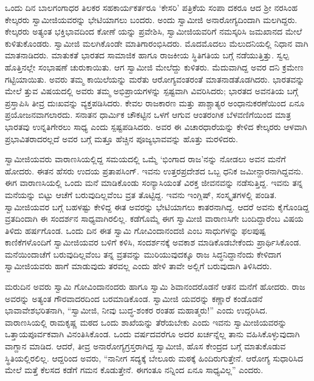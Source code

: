 ಒಂದು ದಿನ ಬಾಲಗಂಗಾಧರ ತಿಲಕರ ಸಹಕಾರ್ಯಕರ್ತರೂ ‘ಕೇಸರಿ’ ಪತ್ರಿಕೆಯ ಸಂಪಾ ದಕರೂ ಆದ ಶ್ರೀ ನರಸಿಂಹ ಕೇಲ್ಕರರು ಸ್ವಾಮೀಜಿಯವರನ್ನು ಭೇಟಿಯಾಗಲು ಬಂದರು. ಅಂದು ಸ್ವಾಮೀಜಿ ಅನಾರೋಗ್ಯದಿಂದಾಗಿ ಮಲಗಿದ್ದರು. ಕೇಲ್ಕರರು ಅತ್ಯಂತ ಭಕ್ತಿಭಾವದಿಂದ ಕೋಣೆ ಯನ್ನು ಪ್ರವೇಶಿಸಿ, ಸ್ವಾಮೀಜಿಯವರಿಗೆ ನಮಸ್ಕರಿಸಿ ಜಮಖಾನದ ಮೇಲೆ ಕುಳಿತುಕೊಂಡರು. ಸ್ವಾಮೀಜಿ ಮಲಗಿಕೊಂಡೇ ಮಾತಿಗಾರಂಭಿಸಿದರು. ಮೊದಮೊದಲು ಮೆಲುದನಿಯಲ್ಲಿ ನಿಧಾನ ವಾಗಿ ಮಾತನಾಡಿದರು. ಮಾತುಕತೆ ಭಾರತದ ಸಾಮಾಜಿಕ ಹಾಗೂ ರಾಜಕೀಯ ಸ್ಥಿತಿಗತಿಯ ಬಗ್ಗೆ ನಡೆಯುತ್ತಿತ್ತು. ಸ್ವಲ್ಪ ಹೊತ್ತಿನಲ್ಲೇ ಸಂಭಾಷಣೆ ಚುರುಕಾಯಿತು. ಆಗ ಸ್ವಾಮೀಜಿ ಮೇಲೆದ್ದು ಕುಳಿತರು. ಮೆದುವಾಗಿದ್ದ ಅವರ ದನಿ ಕ್ರಮೇಣ ಗಟ್ಟಿಯಾಯಿತು. ಅವರು ತಮ್ಮ ಕಾಯಿಲೆಯನ್ನು ಮರೆತು ಆರೋಗ್ಯವಂತರಂತೆ ಮಾತನಾಡತೊಡಗಿದರು. ಭಾರತವನ್ನು ಮೇಲೆ ತ್ತುವ ವಿಷಯದಲ್ಲಿ ಅವರು ತಮ್ಮ ಅಭಿಪ್ರಾಯಗಳನ್ನು ಸ್ಪಷ್ಟವಾಗಿ ವಿವರಿಸಿದರು; ಭಾರತದ ಅವನತಿಯ ಬಗ್ಗೆ ಪ್ರಸ್ತಾಪಿಸಿ ತೀವ್ರ ದುಃಖವನ್ನು ವ್ಯಕ್ತಪಡಿಸಿದರು. ಕೇವಲ ರಾಜಕಾರಣ ಮತ್ತು ಪಾಶ್ಚಾತ್ಯರ ಅಂಧಾನುಕರಣೆಯಿಂದ ಏನೂ ಪ್ರಯೋಜನವಾಗಲಾರದು. ಸನಾತನ ಧಾರ್ಮಿಕ ಚೌಕಟ್ಟಿನ ಒಳಗೆ ಆಗುವ ಆಂತರಂಗಿಕ ಬೆಳವಣಿಗೆಯಿಂದ ಮಾತ್ರ ಭಾರತವು ಉನ್ನತಿಗೇರಲು ಸಾಧ್ಯ ಎಂದು ಸ್ಪಷ್ಟಪಡಿಸಿದರು. ಅವರ ಈ ವಿಚಾರಧಾರೆಯನ್ನು ಕೇಳಿದ ಕೇಲ್ಕರರು ಆಳವಾಗಿ ಪ್ರಭಾವಿತರಾದರಲ್ಲದೆ ಅವರ ಬಗ್ಗೆ ಮತ್ತೂ ಹೆಚ್ಚಿನ ಪೂಜ್ಯಭಾವವನ್ನು ಹೊತ್ತು ಮರಳಿದರು.

ಸ್ವಾಮೀಜಿಯವರು ವಾರಾಣಸಿಯಲ್ಲಿದ್ದ ಸಮಯದಲ್ಲಿ ಒಮ್ಮೆ ‘ಭಿಂಗಾದ ರಾಜ’ನನ್ನು ನೋಡಲು ಅವನ ಮನೆಗೆ ಹೋದರು. ಈತನ ಹೆಸರು ಉದಯ ಪ್ರತಾಪಸಿಂಗ್. ಇವನು ಉತ್ತರಪ್ರದೇಶದ ಒಬ್ಬ ಧನಿಕ ಜಮೀನ್ದಾರನಾಗಿದ್ದವನು. ಈಗ ವಾರಾಣಸಿಯಲ್ಲಿ ಒಂದು ಮನೆ ಮಾಡಿಕೊಂಡು ಸಂನ್ಯಾಸಿಯಂತೆ ವಿರಕ್ತ ಜೀವನವನ್ನು ನಡೆಸುತ್ತಿದ್ದ. ಇವನು ತನ್ನ ಮನೆಯನ್ನು ಬಿಟ್ಟು ಆಚೆಗೆ ಬರುವುದಿಲ್ಲವೆಂಬ ವ್ರತ ತೊಟ್ಟಿದ್ದ. ಇವನು ಇಂಗ್ಲಿಷ್, ಸಂಸ್ಕೃತಗಳಲ್ಲಿ ಪಂಡಿತ. ಸ್ವಾಮೀಜಿಯವರ ಬಗ್ಗೆ ಬಹಳಷ್ಟು ಕೇಳಿದ್ದ ಈತ ಅವರನ್ನು ಭೇಟಿಯಾಗಲು ಕಾತರನಾಗಿದ್ದ. ಆದರೆ ಅವನು ಕೈಗೊಂಡಿದ್ದ ವ್ರತದಿಂದಾಗಿ ಈ ಸಂದರ್ಶನ ಸಾಧ್ಯವಾಗಿರಲಿಲ್ಲ. ಕಡೆಗೊಮ್ಮೆ ಈಗ ಸ್ವಾಮೀಜಿ ವಾರಾಣಸಿಗೇ ಬಂದಿದ್ದಾರೆಂಬ ವಿಷಯ ತಿಳಿದು ಹರ್ಷಗೊಂಡ. ಒಂದು ದಿನ ಈತ ಸ್ವಾಮಿ ಗೋವಿಂದಾನಂದಜಿ ಎಂಬ ಸಾಧುಗಳನ್ನು ಫಲಪುಷ್ಪ ಕಾಣಿಕೆಗಳೊಂದಿಗೆ ಸ್ವಾಮೀಜಿಯವರ ಬಳಿಗೆ ಕಳಿಸಿ, ಸಂದರ್ಶನಕ್ಕೆ ಅವಕಾಶ ಮಾಡಿಕೊಡಬೇಕೆಂದು ಪ್ರಾರ್ಥಿಸಿಕೊಂಡ. ಮನೆಯಿಂದಾಚೆಗೆ ಬರುವುದಿಲ್ಲವೆಂಬ ತನ್ನ ವ್ರತವನ್ನು ಮುರಿಯುವುದಕ್ಕೂ ರಾಜ ಸಿದ್ಧನಿದ್ದಾನೆಂದು ಕೇಳಿದಾಗ ಸ್ವಾಮೀಜಿಯವರು ಹಾಗೆ ಮಾಡುವುದು ತರವಲ್ಲ ಎಂದು ಹೇಳಿ ತಾವೇ ಅಲ್ಲಿಗೆ ಬರುವುದಾಗಿ ತಿಳಿಸಿದರು.

ಮರುದಿನ ಅವರು ಸ್ವಾಮಿ ಗೋವಿಂದಾನಂದರು ಹಾಗೂ ಸ್ವಾಮಿ ಶಿವಾನಂದರೊಡನೆ ಆತನ ಮನೆಗೆ ಹೋದರು. ರಾಜ ಅವರನ್ನು ಅತ್ಯಂತ ಗೌರವಾದರದಿಂದ ಬರಮಾಡಿಕೊಂಡ. ಸ್ವಾಮೀಜಿ ಯವರನ್ನು ಕಣ್ಣಾರೆ ಕಂಡೊಡನೆ ಭಾವಾವೇಶಭರಿತನಾಗಿ, “ಸ್ವಾಮೀಜಿ, ನೀವು ಬುದ್ಧ-ಶಂಕರ ರಂತಹ ಮಹಾತ್ಮರು!” ಎಂದು ಉದ್ಗರಿಸಿದ. ವಾರಾಣಸಿಯಲ್ಲಿ ರಾಮಕೃಷ್ಣ ಮಠದ ಒಂದು ಶಾಖೆಯನ್ನು ತೆರೆಯಬೇಕು ಎಂದು ಇವನು ಸ್ವಾಮೀಜಿಯವರನ್ನು ಒತ್ತಾಯಪೂರ್ವಕವಾಗಿ ವಿನಂತಿಸಿಕೊಂಡ. ಒಂದು ವರ್ಷದವರೆಗೂ ಅದರ ಖರ್ಚನ್ನೆಲ್ಲ ತಾನು ವಹಿಸಿಕೊಳ್ಳುವುದಾಗಿ ವಾಗ್ದಾನ ಮಾಡಿದ. ಆದರೆ, ತೀವ್ರ ಅನಾರೋಗ್ಯಗ್ರಸ್ತರಾಗಿದ್ದ ಸ್ವಾಮೀಜಿ, ಹೊಸ ಕೇಂದ್ರದ ಬಗ್ಗೆ ಮಾತುಕೊಡುವ ಸ್ಥಿತಿಯಲ್ಲಿರಲಿಲ್ಲ. ಆದ್ದರಿಂದ ಅವರು, “ನಾನೀಗ ಸದ್ಯಕ್ಕೆ ಬೇಲೂರು ಮಠಕ್ಕೆ ಹಿಂದಿರುಗುತ್ತೇನೆ. ಆರೋಗ್ಯ ಸುಧಾರಿಸಿದ ಮೇಲೆ ಮತ್ತೆ ಕೆಲಸದ ಕಡೆಗೆ ಗಮನ ಕೊಡುತ್ತೇನೆ. ಈಗಂತೂ ನನ್ನಿಂದ ಏನೂ ಸಾಧ್ಯವಿಲ್ಲ” ಎಂದರು.

